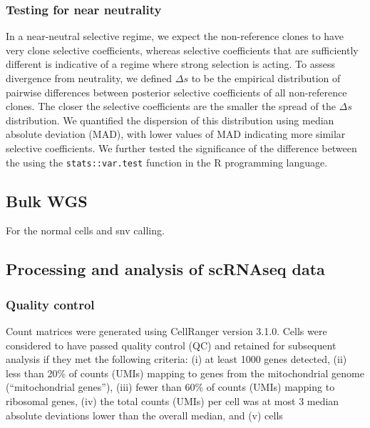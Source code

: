 \documentclass{article}
\begin{document}
\subsubsection{Testing for near neutrality}
In a near-neutral selective regime, we expect the non-reference clones to have very clone selective coefficients, whereas selective coefficients that are sufficiently different is indicative of a regime where strong selection is acting.
To assess divergence from neutrality, we defined $\Delta s$ to be the empirical distribution of pairwise differences between posterior selective coefficients of all non-reference clones.
The closer the selective coefficients are the smaller the spread of the $\Delta s$ distribution. 
We quantified the dispersion of this distribution using median absolute deviation (MAD), with lower values of MAD indicating more similar selective coefficients. 
We further tested the significance of the difference between the 
using the \texttt{stats::var.test} function in the R programming language. 



\subsection{Bulk WGS}
For the normal cells and snv calling. 

\subsection{Processing and analysis of scRNAseq data }

\subsubsection{Quality control}

Count matrices were generated using CellRanger version 3.1.0. Cells were considered to have passed quality control (QC) and retained for subsequent analysis if they met the following criteria: (i) at least 1000 genes detected, (ii) less than 20\% of counts (UMIs) mapping to genes from the mitochondrial genome (``mitochondrial genes''), (iii) fewer than 60\% of counts (UMIs) mapping to ribosomal genes, (iv) the total counts (UMIs) per cell was at most 3 median absolute deviations lower than the overall median, and (v) cells 
\end{document}
